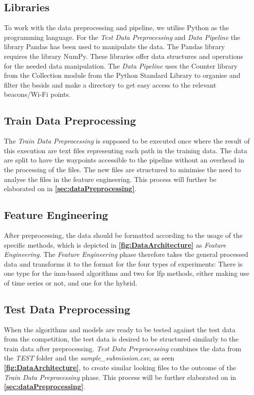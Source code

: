 \subsection{Libraries}
To work with the data preprocessing and pipeline, we utilise Python as the programming language. For the \textit{Test Data Preprocessing} and \textit{Data Pipeline} the library Pandas\cite{pandas} has been used to manipulate the data. The Pandas library requires the library NumPy\cite{numpy}. These libraries offer data structures and operations for the needed data manipulation.
The \textit{Data Pipeline} uses the Counter library from the Collection module from the Python Standard Library to organise and filter the \gls{bssid}s and make a directory to get easy access to the relevant beacons/Wi-Fi points.

\subsection{Train Data Preprocessing}
The \textit{Train Data Preprocessing} is supposed to be executed once where the result of this execution are text files representing each path in the training data. The data are split to have the waypoints accessible to the pipeline without an overhead in the processing of the files. The new files are structured to minimise the need to analyse the files in the feature engineering. This process will further be elaborated on in \textbf{\autoref{sec:dataPreprocessing}}.

\subsection{Feature Engineering} \label{sec:datapipeline}
After preprocessing, the data should be formatted according to the usage of the specific methods, which is depicted in \textbf{\autoref{fig:DataArchitecture}} as \textit{Feature Engineering}. The \textit{Feature Engineering} phase therefore takes the general processed data and transforms it to the format for the four types of experiments: There is one type for the \gls{imu}-based algorithms and two for \gls{lfp} methods, either making use of time series or not, and one for the hybrid.

\subsection{Test Data Preprocessing}
When the algorithms and models are ready to be tested against the test data from the competition, the test data is desired to be structured similarly to the train data after preprocessing. \textit{Test Data Preprocessing} combines the data from the \textit{TEST} folder and the \textit{sample\_submission.csv}, as seen \textbf{\autoref{fig:DataArchitecture}}, to create similar looking files to the outcome of the \textit{Train Data Preprocessing} phase. 
This process will be further elaborated on in \textbf{\autoref{sec:dataPreprocessing}}.

